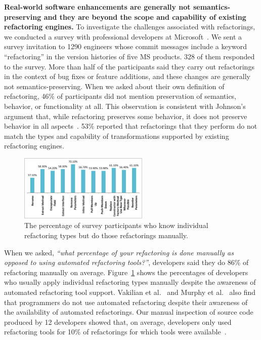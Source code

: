 \documentclass[runningheads,a4paper]{llncs}
\begin{document}
{\bf Real-world software enhancements are generally not semantics-preserving and they are beyond the scope and capability of existing refactoring engines.} To investigate the challenges associated with refactorings, we conducted a survey with professional developers at Microsoft~\cite{Kim2012:fieldrefactoring}. We sent a survey invitation to 1290 engineers whose commit messages include a keyword ``refactoring'' in the version histories of five MS products. 328 of them responded to the survey. More than half of the participants said they carry out refactorings in the context of bug fixes or feature additions, and these changes are generally not semantics-preserving. When we asked about their own definition of refactoring, 46\% of participants did not mention preservation of semantics, behavior, or functionality at all. This observation is consistent with Johnson's argument that, while refactoring preserves some behavior, it does not preserve behavior in all aspects~\cite{Johnson2011}. 53\% reported that refactorings that they perform do not match the types and capability of transformations supported by existing refactoring engines. 


\begin{figure}
\vspace*{-1ex}
    \includegraphics[width=0.55\textwidth]{images/manualRefactoring.pdf}
\centering
\caption{The percentage of survey participants who know individual refactoring types but do those refactorings manually.} 
\label{fig:manualRefactoring} 
\end{figure} 

When we asked, {\it ``what percentage of your refactoring is done manually as opposed to using automated refactoring tools?''}, developers said they do 86\% of refactoring manually on average. Figure~\ref{fig:manualRefactoring} shows the percentages of developers who usually apply individual refactoring types manually despite the awareness of automated refactoring tool support. Vakilian et al.~\cite{Vakilian2012:usedisuse} and Murphy et al.~\cite{Murphy2006:JSD} also find that programmers do not use automated refactoring despite their awareness of the availability of automated refactorings. 
Our manual inspection of source code produced by 12 developers showed that, on average,
developers only used refactoring tools for 10\% of refactorings for which tools were
available~\cite{Murphy-Hill2009:refactor}. 
\end{document}
